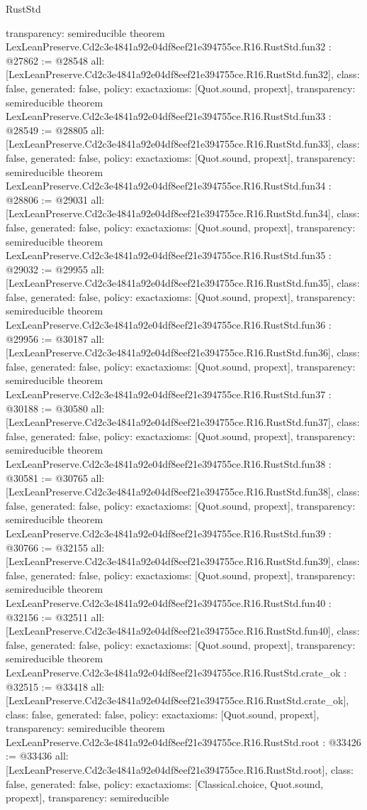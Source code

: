 \begin{lexlean}{RustStd}
\begin{coremodule}
{  transparency: semireducible
}
theorem LexLeanPreserve.Cd2c3e4841a92e04df8eef21e394755ce.R16.RustStd.fun32 : @27862 := @28548 {
  all: [LexLeanPreserve.Cd2c3e4841a92e04df8eef21e394755ce.R16.RustStd.fun32],
  class: false,
  generated: false,
  policy: exact{axioms: [Quot.sound, propext]},
  transparency: semireducible
}
theorem LexLeanPreserve.Cd2c3e4841a92e04df8eef21e394755ce.R16.RustStd.fun33 : @28549 := @28805 {
  all: [LexLeanPreserve.Cd2c3e4841a92e04df8eef21e394755ce.R16.RustStd.fun33],
  class: false,
  generated: false,
  policy: exact{axioms: [Quot.sound, propext]},
  transparency: semireducible
}
theorem LexLeanPreserve.Cd2c3e4841a92e04df8eef21e394755ce.R16.RustStd.fun34 : @28806 := @29031 {
  all: [LexLeanPreserve.Cd2c3e4841a92e04df8eef21e394755ce.R16.RustStd.fun34],
  class: false,
  generated: false,
  policy: exact{axioms: [Quot.sound, propext]},
  transparency: semireducible
}
theorem LexLeanPreserve.Cd2c3e4841a92e04df8eef21e394755ce.R16.RustStd.fun35 : @29032 := @29955 {
  all: [LexLeanPreserve.Cd2c3e4841a92e04df8eef21e394755ce.R16.RustStd.fun35],
  class: false,
  generated: false,
  policy: exact{axioms: [Quot.sound, propext]},
  transparency: semireducible
}
theorem LexLeanPreserve.Cd2c3e4841a92e04df8eef21e394755ce.R16.RustStd.fun36 : @29956 := @30187 {
  all: [LexLeanPreserve.Cd2c3e4841a92e04df8eef21e394755ce.R16.RustStd.fun36],
  class: false,
  generated: false,
  policy: exact{axioms: [Quot.sound, propext]},
  transparency: semireducible
}
theorem LexLeanPreserve.Cd2c3e4841a92e04df8eef21e394755ce.R16.RustStd.fun37 : @30188 := @30580 {
  all: [LexLeanPreserve.Cd2c3e4841a92e04df8eef21e394755ce.R16.RustStd.fun37],
  class: false,
  generated: false,
  policy: exact{axioms: [Quot.sound, propext]},
  transparency: semireducible
}
theorem LexLeanPreserve.Cd2c3e4841a92e04df8eef21e394755ce.R16.RustStd.fun38 : @30581 := @30765 {
  all: [LexLeanPreserve.Cd2c3e4841a92e04df8eef21e394755ce.R16.RustStd.fun38],
  class: false,
  generated: false,
  policy: exact{axioms: [Quot.sound, propext]},
  transparency: semireducible
}
theorem LexLeanPreserve.Cd2c3e4841a92e04df8eef21e394755ce.R16.RustStd.fun39 : @30766 := @32155 {
  all: [LexLeanPreserve.Cd2c3e4841a92e04df8eef21e394755ce.R16.RustStd.fun39],
  class: false,
  generated: false,
  policy: exact{axioms: [Quot.sound, propext]},
  transparency: semireducible
}
theorem LexLeanPreserve.Cd2c3e4841a92e04df8eef21e394755ce.R16.RustStd.fun40 : @32156 := @32511 {
  all: [LexLeanPreserve.Cd2c3e4841a92e04df8eef21e394755ce.R16.RustStd.fun40],
  class: false,
  generated: false,
  policy: exact{axioms: [Quot.sound, propext]},
  transparency: semireducible
}
theorem LexLeanPreserve.Cd2c3e4841a92e04df8eef21e394755ce.R16.RustStd.crate_ok : @32515 := @33418 {
  all: [LexLeanPreserve.Cd2c3e4841a92e04df8eef21e394755ce.R16.RustStd.crate_ok],
  class: false,
  generated: false,
  policy: exact{axioms: [Quot.sound, propext]},
  transparency: semireducible
}
theorem LexLeanPreserve.Cd2c3e4841a92e04df8eef21e394755ce.R16.RustStd.root : @33426 := @33436 {
  all: [LexLeanPreserve.Cd2c3e4841a92e04df8eef21e394755ce.R16.RustStd.root],
  class: false,
  generated: false,
  policy: exact{axioms: [Classical.choice, Quot.sound, propext]},
  transparency: semireducible
}


\end{coremodule}
\end{lexlean}
